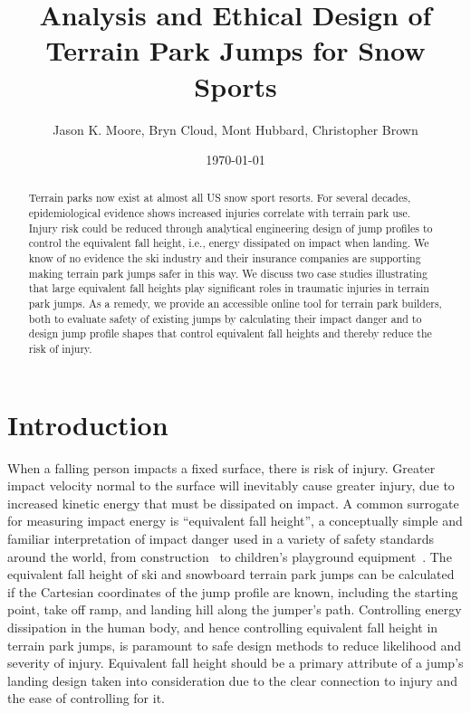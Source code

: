 \documentclass{article}
\title{Analysis and Ethical Design of Terrain Park Jumps for Snow Sports}
\author{Jason K. Moore, Bryn Cloud, Mont Hubbard, Christopher Brown}
\date{\today}
\begin{document}
\maketitle

\begin{abstract}
  Terrain parks now exist at almost all US snow sport resorts. For several
  decades, epidemiological evidence shows increased injuries correlate with
  terrain park use. Injury risk could be reduced through analytical engineering
  design of jump profiles to control the equivalent fall height, i.e., energy
  dissipated on impact when landing. We know of no evidence the ski industry
  and their insurance companies are supporting making terrain park jumps safer
  in this way. We discuss two case studies illustrating that large equivalent
  fall heights play significant roles in traumatic injuries in terrain park
  jumps. As a remedy, we provide an accessible online tool for terrain park
  builders, both to evaluate safety of existing jumps by calculating their
  impact danger and to design jump profile shapes that control equivalent fall
  heights and thereby reduce the risk of injury.
\end{abstract}

\section{Introduction}
%
When a falling person impacts a fixed surface, there is risk of injury. Greater
impact velocity normal to the surface will inevitably cause greater injury, due
to increased kinetic energy that must be dissipated on impact. A common
surrogate for measuring impact energy is ``equivalent fall height'', a
conceptually simple and familiar interpretation of impact danger used in a
variety of safety standards around the world, from construction~\cite{OSHA2021}
to children's playground equipment~\cite{Chalmers1996}. The equivalent fall
height of ski and snowboard terrain park jumps can be
calculated~\cite{McNeil2012} if the Cartesian coordinates of the jump profile
are known, including the starting point, take off ramp, and landing hill along
the jumper's path. Controlling energy dissipation in the human body, and hence
controlling equivalent fall height in terrain park jumps, is paramount to safe
design methods to reduce likelihood and severity of injury. Equivalent fall
height should be a primary attribute of a jump's landing design taken into
consideration due to the clear connection to injury and the ease of controlling
for it.
\end{document}
